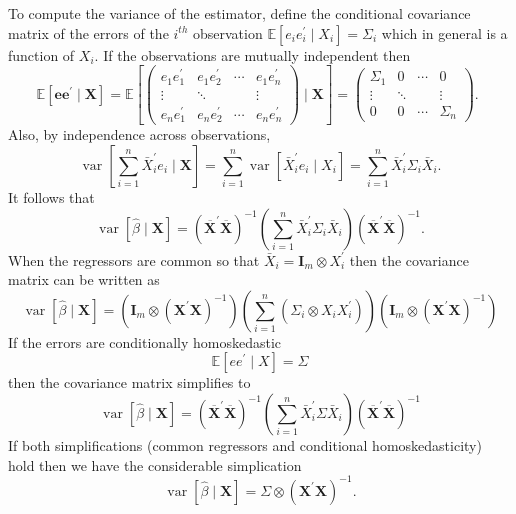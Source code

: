 \documentclass[10pt]{article}
\begin{document}
To compute the variance of the estimator, define the conditional covariance matrix of the errors of the $i^{t h}$ observation $\mathbb{E}\left[e_{i} e_{i}^{\prime} \mid X_{i}\right]=\Sigma_{i}$ which in general is a function of $X_{i}$. If the observations are mutually independent then
$$
\mathbb{E}\left[\boldsymbol{e} \boldsymbol{e}^{\prime} \mid \boldsymbol{X}\right]=\mathbb{E}\left[\left(\begin{array}{cccc}
e_{1} e_{1}^{\prime} & e_{1} e_{2}^{\prime} & \cdots & e_{1} e_{n}^{\prime} \\
\vdots & \ddots & & \vdots \\
e_{n} e_{1}^{\prime} & e_{n} e_{2}^{\prime} & \cdots & e_{n} e_{n}^{\prime}
\end{array}\right) \mid \boldsymbol{X}\right]=\left(\begin{array}{cccc}
\Sigma_{1} & 0 & \cdots & 0 \\
\vdots & \ddots & & \vdots \\
0 & 0 & \cdots & \Sigma_{n}
\end{array}\right) \text {. }
$$
Also, by independence across observations,
$$
\operatorname{var}\left[\sum_{i=1}^{n} \bar{X}_{i}^{\prime} e_{i} \mid \boldsymbol{X}\right]=\sum_{i=1}^{n} \operatorname{var}\left[\bar{X}_{i}^{\prime} e_{i} \mid X_{i}\right]=\sum_{i=1}^{n} \bar{X}_{i}^{\prime} \Sigma_{i} \bar{X}_{i} .
$$
It follows that
$$
\operatorname{var}[\widehat{\beta} \mid \boldsymbol{X}]=\left(\overline{\boldsymbol{X}}^{\prime} \overline{\boldsymbol{X}}\right)^{-1}\left(\sum_{i=1}^{n} \bar{X}_{i}^{\prime} \Sigma_{i} \bar{X}_{i}\right)\left(\overline{\boldsymbol{X}}^{\prime} \overline{\boldsymbol{X}}\right)^{-1} .
$$
When the regressors are common so that $\bar{X}_{i}=\boldsymbol{I}_{m} \otimes X_{i}^{\prime}$ then the covariance matrix can be written as
$$
\operatorname{var}[\widehat{\beta} \mid \boldsymbol{X}]=\left(\boldsymbol{I}_{m} \otimes\left(\boldsymbol{X}^{\prime} \boldsymbol{X}\right)^{-1}\right)\left(\sum_{i=1}^{n}\left(\Sigma_{i} \otimes X_{i} X_{i}^{\prime}\right)\right)\left(\boldsymbol{I}_{m} \otimes\left(\boldsymbol{X}^{\prime} \boldsymbol{X}\right)^{-1}\right)
$$
If the errors are conditionally homoskedastic
$$
\mathbb{E}\left[e e^{\prime} \mid X\right]=\Sigma
$$
then the covariance matrix simplifies to
$$
\operatorname{var}[\widehat{\beta} \mid \boldsymbol{X}]=\left(\overline{\boldsymbol{X}}^{\prime} \overline{\boldsymbol{X}}\right)^{-1}\left(\sum_{i=1}^{n} \bar{X}_{i}^{\prime} \Sigma \bar{X}_{i}\right)\left(\overline{\boldsymbol{X}}^{\prime} \overline{\boldsymbol{X}}\right)^{-1}
$$
If both simplifications (common regressors and conditional homoskedasticity) hold then we have the considerable simplication
$$
\operatorname{var}[\widehat{\beta} \mid \boldsymbol{X}]=\Sigma \otimes\left(\boldsymbol{X}^{\prime} \boldsymbol{X}\right)^{-1} .
$$
\end{document}
